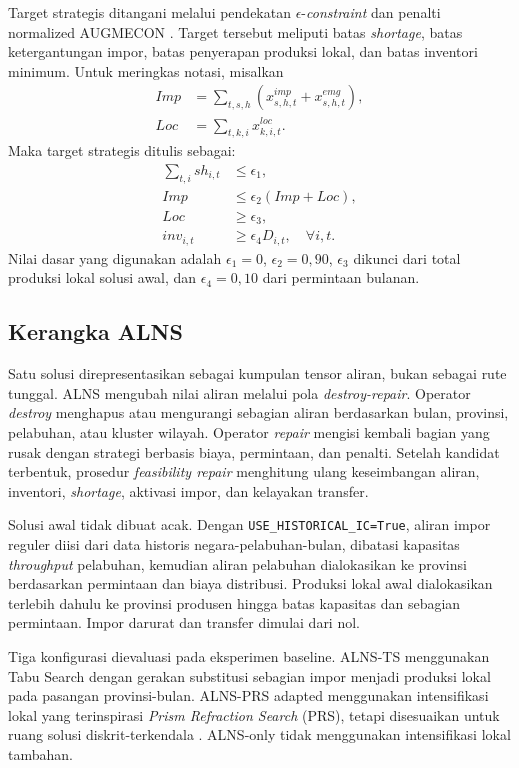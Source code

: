 \documentclass[journal]{IEEEtran}
\theoremstyle{definition}
\theoremstyle{definition}
\theoremstyle{plain}
\begin{document}
    Target strategis ditangani melalui pendekatan $\epsilon$-\textit{constraint} dan penalti normalized AUGMECON \cite{MAVROTAS_EPSILON}. Target tersebut meliputi batas \textit{shortage}, batas ketergantungan impor, batas penyerapan produksi lokal, dan batas inventori minimum. Untuk meringkas notasi, misalkan
    \begin{align}
    Imp &= \sum_{t,s,h}(x^{imp}_{s,h,t}+x^{emg}_{s,h,t}),\\
    Loc &= \sum_{t,k,i}x^{loc}_{k,i,t}.
    \end{align}
    Maka target strategis ditulis sebagai:
    \begin{align}
    \sum_{t,i} sh_{i,t} &\leq \epsilon_1, \\
    Imp &\leq \epsilon_2(Imp+Loc), \\
    Loc &\geq \epsilon_3, \\
    inv_{i,t} &\geq \epsilon_4D_{i,t}, \quad \forall i,t.
    \end{align}
    Nilai dasar yang digunakan adalah $\epsilon_1=0$, $\epsilon_2=0,90$, $\epsilon_3$ dikunci dari total produksi lokal solusi awal, dan $\epsilon_4=0,10$ dari permintaan bulanan.

    \subsection{Kerangka ALNS}
    Satu solusi direpresentasikan sebagai kumpulan tensor aliran, bukan sebagai rute tunggal. ALNS mengubah nilai aliran melalui pola \textit{destroy-repair}. Operator \textit{destroy} menghapus atau mengurangi sebagian aliran berdasarkan bulan, provinsi, pelabuhan, atau kluster wilayah. Operator \textit{repair} mengisi kembali bagian yang rusak dengan strategi berbasis biaya, permintaan, dan penalti. Setelah kandidat terbentuk, prosedur \textit{feasibility repair} menghitung ulang keseimbangan aliran, inventori, \textit{shortage}, aktivasi impor, dan kelayakan transfer.

    Solusi awal tidak dibuat acak. Dengan \texttt{USE\_HISTORICAL\_IC=True}, aliran impor reguler diisi dari data historis negara-pelabuhan-bulan, dibatasi kapasitas \textit{throughput} pelabuhan, kemudian aliran pelabuhan dialokasikan ke provinsi berdasarkan permintaan dan biaya distribusi. Produksi lokal awal dialokasikan terlebih dahulu ke provinsi produsen hingga batas kapasitas dan sebagian permintaan. Impor darurat dan transfer dimulai dari nol.

    Tiga konfigurasi dievaluasi pada eksperimen baseline. ALNS-TS menggunakan Tabu Search dengan gerakan substitusi sebagian impor menjadi produksi lokal pada pasangan provinsi-bulan. ALNS-PRS adapted menggunakan intensifikasi lokal yang terinspirasi \textit{Prism Refraction Search} (PRS), tetapi disesuaikan untuk ruang solusi diskrit-terkendala \cite{kundu2024prism}. ALNS-only tidak menggunakan intensifikasi lokal tambahan.
\end{document}
